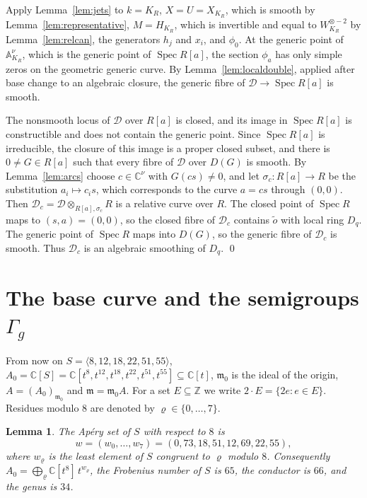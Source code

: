 \documentclass{amsart}
\newtheorem{lemma}[theorem]{Lemma}
\theoremstyle{definition}
\theoremstyle{remark}
\numberwithin{equation}{section}
\newcommand{\C}{\mathbb{C}}
\newcommand{\Z}{\mathbb{Z}}
\newcommand{\A}{\mathbb{A}}
\newcommand{\m}{\mathfrak{m}}
\DeclareMathOperator{\Spec}{Spec}
\begin{document}
Apply Lemma~\ref{lem:jets} to $k=K_R$, $X=U=X_{K_R}$, which is smooth by Lemma~\ref{lem:representative}, $M=H_{K_R}$, which is invertible and equal to $W_{K_R}^{\otimes-2}$ by Lemma~\ref{lem:relcan}, the generators $h_j$ and $x_i$, and $\phi_0$. At the generic point of $\A^\nu_{K_R}$, which is the generic point of $\Spec R[a]$, the section $\phi_a$ has only simple zeros on the geometric generic curve. By Lemma~\ref{lem:localdouble}, applied after base change to an algebraic closure, the generic fibre of $\mathcal D\to\Spec R[a]$ is smooth.

The nonsmooth locus of $\mathcal D$ over $R[a]$ is closed, and its image in $\Spec R[a]$ is constructible and does not contain the generic point. Since $\Spec R[a]$ is irreducible, the closure of this image is a proper closed subset, and there is $0\ne G\in R[a]$ such that every fibre of $\mathcal D$ over $D(G)$ is smooth. By Lemma~\ref{lem:arcs} choose $c\in\C^\nu$ with $G(cs)\ne0$, and let $\sigma_c\colon R[a]\to R$ be the substitution $a_i\mapsto c_is$, which corresponds to the curve $a=cs$ through $(0,0)$. Then $\mathcal D_c=\mathcal D\otimes_{R[a],\sigma_c}R$ is a relative curve over $R$. The closed point of $\Spec R$ maps to $(s,a)=(0,0)$, so the closed fibre of $\mathcal D_c$ contains $\tilde o$ with local ring $D_q$. The generic point of $\Spec R$ maps into $D(G)$, so the generic fibre of $\mathcal D_c$ is smooth. Thus $\mathcal D_c$ is an algebraic smoothing of $D_q$. \qed

\section{The base curve and the semigroups \texorpdfstring{$\Gamma_g$}{Gamma g}}\label{sec:base}

From now on $S=\langle 8,12,18,22,51,55\rangle$, $A_0=\C[S]=\C[t^8,t^{12},t^{18},t^{22},t^{51},t^{55}]\subseteq\C[t]$, $\m_0$ is the ideal of the origin, $A=(A_0)_{\m_0}$ and $\m=\m_0A$. For a set $E\subseteq\Z$ we write $2\cdot E=\{2e:e\in E\}$. Residues modulo $8$ are denoted by $\varrho\in\{0,\dots,7\}$.

\begin{lemma}\label{lem:apery}
The Ap\'ery set of $S$ with respect to $8$ is
\[
w=(w_0,\dots,w_7)=(0,73,18,51,12,69,22,55),
\]
where $w_\varrho$ is the least element of $S$ congruent to $\varrho$ modulo $8$. Consequently $A_0=\bigoplus_\varrho\C[t^8]\,t^{w_\varrho}$, the Frobenius number of $S$ is $65$, the conductor is $66$, and the genus is $34$.
\end{lemma}
\end{document}
